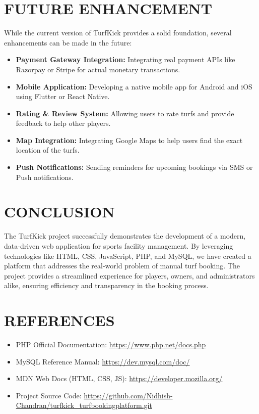 \documentclass[12pt]{report}
\begin{document}
\chapter{FUTURE ENHANCEMENT}
\label{chap:future}
While the current version of TurfKick provides a solid foundation, several enhancements can be made in the future:
\begin{itemize}
    \item \textbf{Payment Gateway Integration:} Integrating real payment APIs like Razorpay or Stripe for actual monetary transactions.
    \item \textbf{Mobile Application:} Developing a native mobile app for Android and iOS using Flutter or React Native.
    \item \textbf{Rating \& Review System:} Allowing users to rate turfs and provide feedback to help other players.
    \item \textbf{Map Integration:} Integrating Google Maps to help users find the exact location of the turfs.
    \item \textbf{Push Notifications:} Sending reminders for upcoming bookings via SMS or Push notifications.
\end{itemize}

\chapter{CONCLUSION}
\label{chap:conclusion}
The TurfKick project successfully demonstrates the development of a modern, data-driven web application for sports facility management. By leveraging technologies like HTML, CSS, JavaScript, PHP, and MySQL, we have created a platform that addresses the real-world problem of manual turf booking. The project provides a streamlined experience for players, owners, and administrators alike, ensuring efficiency and transparency in the booking process.

\chapter{REFERENCES}
\label{chap:ref}
\begin{itemize}
    \item PHP Official Documentation: \url{https://www.php.net/docs.php}
    \item MySQL Reference Manual: \url{https://dev.mysql.com/doc/}
    \item MDN Web Docs (HTML, CSS, JS): \url{https://developer.mozilla.org/}
    \item Project Source Code: \url{https://github.com/Nidhish-Chandran/turfkick_turfbookingplatform.git}
\end{itemize}
\end{document}
